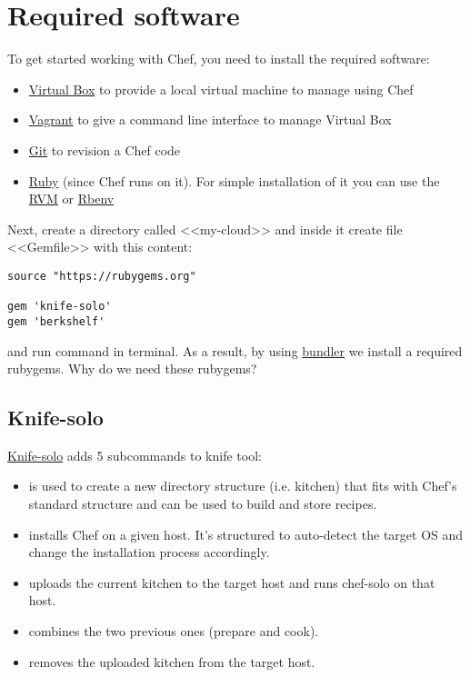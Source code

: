 \section{Required software}
\label{sec:solo-required}

To get started working with Chef, you need to install the required software:

\begin{itemize}
  \item \href{https://www.virtualbox.org/}{Virtual Box} to provide a local virtual machine to manage using Chef
  \item \href{http://www.vagrantup.com/}{Vagrant} to give a command line interface to manage Virtual Box
  \item \href{http://git-scm.com/}{Git} to revision a Chef code
  \item \href{https://www.ruby-lang.org}{Ruby} (since Chef runs on it). For simple installation of it you can use the \href{https://rvm.io/}{RVM} or \href{https://github.com/sstephenson/rbenv}{Rbenv}
\end{itemize}

Next, create a directory called <<my-cloud>> and inside it create file <<Gemfile>> with this content:

\begin{lstlisting}[label=lst:my-cloud-required1,title=my-cloud/Gemfile]
source "https://rubygems.org"

gem 'knife-solo'
gem 'berkshelf'
\end{lstlisting}

and run command  in terminal. As a result, by using \href{http://bundler.io/}{bundler} we install a required rubygems. Why do we need these rubygems?

\subsection{Knife-solo}

\href{http://matschaffer.github.io/knife-solo/}{Knife-solo} adds 5 subcommands to knife tool:

\begin{itemize}
  \item {} is used to create a new directory structure (i.e. kitchen) that fits with Chef's standard structure and can be used to build and store recipes.
  \item {} installs Chef on a given host. It's structured to auto-detect the target OS and change the installation process accordingly.
  \item {} uploads the current kitchen to the target host and runs chef-solo on that host.
  \item {} combines the two previous ones (prepare and cook).
  \item {} removes the uploaded kitchen from the target host.
\end{itemize}

